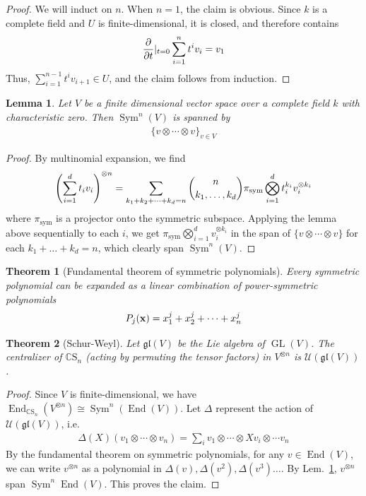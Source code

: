 \documentclass[11pt]{article}
\newtheorem{thm}{Theorem}
\newtheorem{lem}{Lemma}
\theoremstyle{definition}
\newcommand{\End}{\operatorname{End}}
\newcommand{\C}{\mathbb C}
\newcommand{\GL}{\operatorname{GL}}
\newcommand{\Sym}{\operatorname{Sym}}
\newcommand{\perm}{\mathrm{S}}
\begin{document}
\begin{proof}
  We will induct on $n$. When $n = 1$, the claim is obvious. Since $k$ is a
  complete field and $U$ is finite-dimensional, it is closed, and therefore contains
  \begin{align}
    \pdv{t}|_{t= 0} \sum_{i = 1}^n t^i v_i = v_1
  \end{align}
  Thus, $\sum_{i = 1}^{n-1} t^iv_{i+1} \in U$, and the claim follows from induction.
\end{proof}

\begin{lem}\label{lem:sym_irrep}
Let $V$ be a finite dimensional vector space over a complete field $k$ with
characteristic zero. Then
$\Sym^n(V)$ is spanned by
\begin{align}
  \{v \otimes \cdots \otimes v\}_{v \in V}
\end{align}
\end{lem}

\begin{proof}
  By multinomial expansion, we find
\begin{align}
  \qty(\sum_{i=1}^dt_iv_i)^{\otimes n} = \sum_{k_1 +k_2 + \cdots + k_d = n} \binom{n}{k_1, \dots, k_d}\pi_{\text{sym}}\bigotimes_{i=1}^d t_i^{k_i}v_i^{\otimes k_i}
\end{align}
where $\pi_{\text{sym}}$ is a projector onto the symmetric subspace.
Applying the lemma above sequentially to each $i$, we get $\pi_{\text{sym}}\bigotimes_{i=1}^d
v_{i}^{\otimes k_i}$ in the span of $\{v \otimes \cdots \otimes v\}$ for each
$k_1 + \dots + k_d = n$, which clearly span $\Sym^n(V)$.
\end{proof}

\begin{thm}[Fundamental theorem of symmetric polynomials]
Every symmetric polynomial can be expanded as a linear combination of power-symmetric polynomials
\begin{equation}
  P_j(\vb x)  = x_1^j + x_2^j + \cdots + x_n^j
\end{equation}
\end{thm}

\begin{thm}[Schur-Weyl]
Let $\mathfrak{gl}(V)$ be the Lie algebra of $\GL(V)$. The centralizer of
$\mathbb C \perm_n$ (acting by permuting the tensor factors)
 in $V^{\otimes n}$ is $\mathcal U(\mathfrak{gl}(V))$. 
\end{thm}

\begin{proof}
Since $V$ is finite-dimensional, we have $\End_{\C \perm_n}(V^{\otimes n}) \cong
\Sym^n(\End(V))$. Let $\Delta$ represent the action of $\mathcal
U(\mathfrak{gl}(V))$, i.e.
\begin{align}
  \Delta(X)(v_1 \otimes \cdots \otimes v_n) = \sum_{i}v_1 \otimes \cdots \otimes Xv_i \otimes \cdots v_n
\end{align}
By the fundamental theorem on symmetric polynomials, for any $v \in \End(V)$, we
can write $v^{\otimes n}$ as a polynomial in $\Delta(v), \Delta(v^2),
\Delta(v^3) \dots$. By Lem.~\ref{lem:sym_irrep}, $v^{\otimes n}$ span $\Sym^n \End(V)$.
This proves the claim.
\end{proof}
\end{document}
